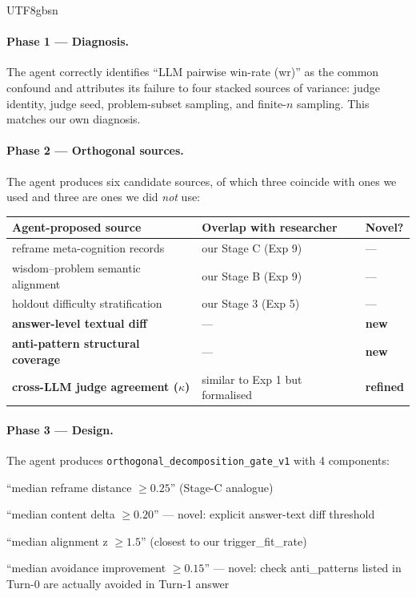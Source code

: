 \documentclass{article}
\begin{document}
\begin{CJK*}{UTF8}{gbsn}
\paragraph{Phase 1 — Diagnosis.} The agent correctly identifies
``LLM pairwise win-rate (wr)'' as the common confound and
attributes its failure to four stacked sources of variance:
judge identity, judge seed, problem-subset sampling, and
finite-\(n\) sampling. This matches our own diagnosis.

\paragraph{Phase 2 — Orthogonal sources.} The agent produces
six candidate sources, of which three coincide with ones we
used and three are ones we did \emph{not} use:

\begin{center}\small
\begin{tabular}{p{4.5cm} p{3.5cm} p{3cm}}
  \toprule
  Agent-proposed source & Overlap with researcher & Novel? \\
  \midrule
  reframe meta-cognition records &  our Stage C (Exp 9)   & — \\
  wisdom–problem semantic alignment & our Stage B (Exp 9) & — \\
  holdout difficulty stratification & our Stage 3 (Exp 5) & — \\
  \textbf{answer-level textual diff}
    & — & \textbf{new}\\
  \textbf{anti-pattern structural coverage}
    & — & \textbf{new}\\
  \textbf{cross-LLM judge agreement ($\kappa$)}
    & similar to Exp 1 but formalised & \textbf{refined}\\
  \bottomrule
\end{tabular}
\end{center}

\paragraph{Phase 3 — Design.} The agent produces
\texttt{orthogonal\_decomposition\_gate\_v1} with 4 components:

\begin{description}[leftmargin=1.4em, topsep=2pt, itemsep=1pt]
  \item[\texttt{reframe\_depth}] ``median reframe distance \(\geq 0.25\)''
    (Stage-C analogue)
  \item[\texttt{substantive\_content\_delta}] ``median content delta
    \(\geq 0.20\)'' — novel: explicit answer-text diff threshold
  \item[\texttt{wisdom\_problem\_alignment}] ``median alignment z
    \(\geq 1.5\)'' (closest to our trigger\_fit\_rate)
  \item[\texttt{antipattern\_avoidance}] ``median avoidance improvement
    \(\geq 0.15\)'' — novel: check anti\_patterns listed in Turn-0
    are actually avoided in Turn-1 answer
\end{description}


\end{CJK*}
\end{document}
